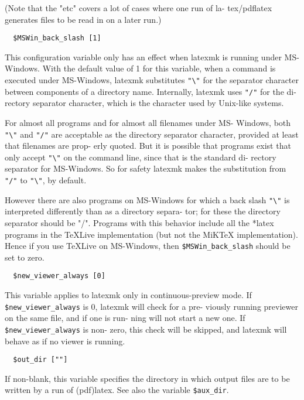 (Note  that the "etc" covers a lot of cases where one run of la-
tex/pdflatex generates files to be read in on a later run.)

\begin{verbatim}
  $MSWin_back_slash [1]
\end{verbatim}

This configuration variable only has an effect when  latexmk  is
running  under MS-Windows.  With the default value of 1 for this
variable, when a command is executed under  MS-Windows,  latexmk
substitutes  \verb|"\"|  for the separator character between components
of a directory name.  Internally, latexmk uses \verb|"/"| for  the  di-
rectory  separator  character,  which  is  the character used by
Unix-like systems.

For almost all programs and for almost all filenames  under  MS-
Windows,  both  \verb|"\"|  and  \verb|"/"|  are  acceptable  as the directory
separator character, provided at least that filenames are  prop-
erly  quoted.   But it is possible that programs exist that only
accept \verb|"\"| on the command line, since that is the  standard  di-
rectory  separator  for MS-Windows.  So for safety latexmk makes
the substitution from \verb|"/"| to \verb|"\"|, by default.

However there are also programs on MS-Windows for which  a  back
slash \verb|"\"| is interpreted differently than as a directory separa-
tor; for these the directory separator should be "/".   Programs
with  this  behavior  include  all  the  *latex  programs in the
TeXLive implementation  (but  not  the  MiKTeX  implementation).
Hence  if  you use TeXLive on MS-Windows, then \verb|$MSWin_back_slash|
should be set to zero.


\begin{verbatim}
  $new_viewer_always [0]
\end{verbatim}

This variable applies  to  latexmk  only  in  continuous-preview
mode.  If \verb|$new_viewer_always| is 0, latexmk will check for a pre-
viously running previewer on the same file, and if one  is  run-
ning  will  not  start a new one.  If \verb|$new_viewer_always| is non-
zero, this check will be skipped, and latexmk will behave as  if
no viewer is running.

\begin{verbatim}
  $out_dir [""]
\end{verbatim}

If  non-blank,  this  variable  specifies the directory in which
output files are to be written by a run of (pdf)latex.  See also
the variable \verb|$aux_dir|.

